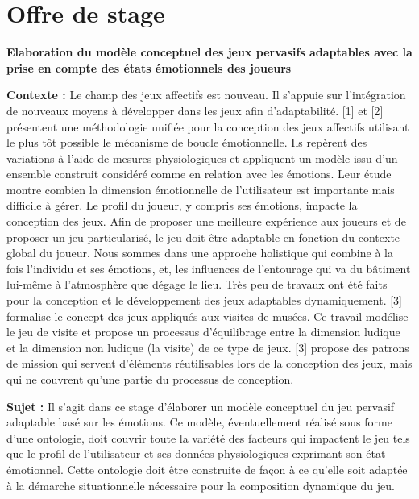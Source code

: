 \documentclass{article}
\begin{document}
\section{Offre de stage}\label{app:annexe1}
	\textbf{Elaboration du modèle conceptuel des jeux pervasifs adaptables avec la prise en compte des états émotionnels des joueurs}\par
	\medskip
	\textbf{Contexte :}\newline
	Le champ des jeux affectifs est nouveau. Il s’appuie sur l’intégration de nouveaux moyens à développer dans les jeux afin d’adaptabilité. [1] et [2] présentent une méthodologie unifiée pour la conception des jeux affectifs utilisant le plus tôt possible le mécanisme de boucle émotionnelle. Ils repèrent des variations à l’aide de mesures physiologiques et appliquent un modèle issu d’un ensemble construit considéré comme en relation avec les émotions. Leur étude montre combien la dimension émotionnelle de l’utilisateur est importante mais difficile à gérer.\newline
	Le profil du joueur, y compris ses émotions, impacte la conception des jeux. Afin de proposer une meilleure expérience aux joueurs et de proposer un jeu particularisé, le jeu doit être adaptable en fonction du contexte global du joueur. Nous sommes dans une approche holistique qui combine à la fois l’individu et ses émotions, et, les influences de l’entourage qui va du bâtiment lui-même à l’atmosphère que dégage le lieu. Très peu de travaux ont été faits pour la conception et le développement des jeux adaptables dynamiquement. [3] formalise le concept des jeux appliqués aux visites de musées. Ce travail modélise le jeu de visite et propose un processus d’équilibrage entre la dimension ludique et la dimension non ludique (la visite) de ce type de jeux. [3] propose des patrons de mission qui servent d’éléments réutilisables lors de la conception des jeux, mais qui ne couvrent qu’une partie du processus de conception.\par
	\textbf{Sujet :}\newline
	Il s’agit dans ce stage d’élaborer un modèle conceptuel du jeu pervasif adaptable basé sur les émotions. Ce modèle, éventuellement réalisé sous forme d’une ontologie, doit couvrir toute la variété des facteurs qui impactent le jeu tels que le profil de l’utilisateur et ses données physiologiques exprimant son état émotionnel. Cette ontologie doit être construite de façon à ce qu’elle soit adaptée à la démarche situationnelle nécessaire pour la composition dynamique du jeu.



\end{document}
